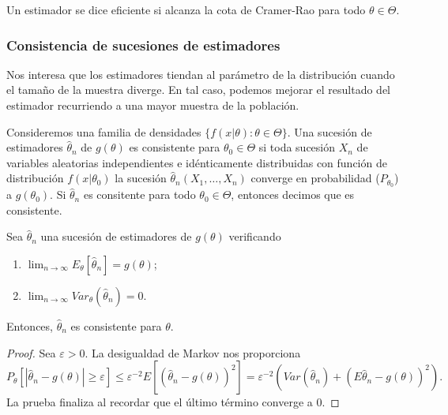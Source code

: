     \begin{definition}
        Un estimador se dice eficiente si alcanza la cota de Cramer-Rao para todo $\theta \in \Theta$.
    \end{definition}

    \subsubsection{Consistencia de sucesiones de estimadores}

    Nos interesa que los estimadores tiendan al parámetro de la distribución cuando el tamaño de la muestra diverge. En tal caso, podemos mejorar el resultado del estimador recurriendo a una mayor muestra de la población.

    \begin{definition}
        Consideremos una familia de densidades $\{f(x | \theta) : \theta \in \Theta\}$. Una sucesión de estimadores $\hat\theta_n$ de $g(\theta)$ es consistente para $\theta_0 \in \Theta$ si toda sucesión $X_n$ de variables aleatorias independientes e idénticamente distribuidas con función de distribución $f(x | \theta_0)$ la sucesión $\hat\theta_n(X_1, \ldots, X_n)$ converge en probabilidad ($P_{\theta_0}$) a $g(\theta_0)$. Si $\hat\theta_n$ es consitente para todo $\theta_0 \in \Theta$, entonces decimos que es consistente.
    \end{definition}

    \begin{thm}
        Sea $\hat\theta_n$ una sucesión de estimadores de $g(\theta)$ verificando
        \begin{enumerate}
            \item $\lim_{n \to \infty} E_\theta[\hat\theta_n] = g(\theta)$;
            \item $\lim_{n \to \infty} Var_\theta(\hat\theta_n) = 0$.
        \end{enumerate}
        Entonces, $\hat\theta_n$ es consistente para $\theta$.
    \end{thm}
    \begin{proof}
        Sea $\varepsilon > 0$. La desigualdad de Markov nos proporciona
        \[P_\theta[|\hat\theta_n - g(\theta)| \ge \varepsilon] \le \varepsilon^{-2} E[(\hat\theta_n - g(\theta))^2] = \varepsilon^{-2}  \left(Var(\hat\theta_n) + (E\hat\theta_n -g(\theta))^2\right).\]
        La prueba finaliza al recordar que el último término converge a $0$.
    \end{proof}

